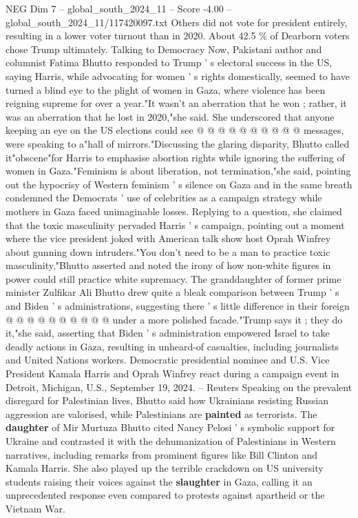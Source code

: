 \begin{textsample}{NEG Dim 7 – global\_south\_2024\_11 – Score -4.00 – global\_south\_2024\_11/117420097.txt}
Others did not vote for president entirely, resulting in a lower voter turnout than in 2020.
About 42.5 \% of Dearborn voters chose Trump ultimately.
Talking to Democracy Now, Pakistani author and columnist Fatima Bhutto responded to Trump ' s electoral success in the US, saying Harris, while advocating for women ' s rights domestically, seemed to have turned a blind eye to the plight of women in Gaza, where violence has been reigning supreme for over a year."It wasn't an aberration that he won ; rather, it was an aberration that he lost in 2020,"she said.
She underscored that anyone keeping an eye on the US elections could see @ @ @ @ @ @ @ @ @ @ messages, were speaking to a"hall of mirrors."Discussing the glaring disparity, Bhutto called it"obscene"for Harris to emphasise abortion rights while ignoring the suffering of women in Gaza."Feminism is about liberation, not termination,"she said, pointing out the hypocrisy of Western feminism ' s silence on Gaza and in the same breath condemned the Democrats ' use of celebrities as a campaign strategy while mothers in Gaza faced unimaginable losses.
Replying to a question, she claimed that the toxic masculinity pervaded Harris ' s campaign, pointing out a moment where the vice president joked with American talk show host Oprah Winfrey about gunning down intruders."You don't need to be a man to practice toxic masculinity,"Bhutto asserted and noted the irony of how non-white figures in power could still practice white supremacy.
The granddaughter of former prime minister Zulfikar Ali Bhutto drew quite a bleak comparison between Trump ' s and Biden ' s administrations, suggesting there ' s little difference in their foreign @ @ @ @ @ @ @ @ @ @ under a more polished facade."Trump says it ; they do it,"she said, asserting that Biden ' s administration empowered Israel to take deadly actions in Gaza, resulting in unheard-of casualties, including journalists and United Nations workers.
Democratic presidential nominee and U.S.
Vice President Kamala Harris and Oprah Winfrey react during a campaign event in Detroit, Michigan, U.S., September 19, 2024. -- Reuters Speaking on the prevalent disregard for Palestinian lives, Bhutto said how Ukrainians resisting Russian aggression are valorised, while Palestinians are \textbf{painted} as terrorists.
The \textbf{daughter} of Mir Murtuza Bhutto cited Nancy Pelosi ' s symbolic support for Ukraine and contrasted it with the dehumanization of Palestinians in Western narratives, including remarks from prominent figures like Bill Clinton and Kamala Harris.
She also played up the terrible crackdown on US university students raising their voices against the \textbf{slaughter} in Gaza, calling it an unprecedented response even compared to protests against apartheid or the Vietnam War.

\end{textsample}
